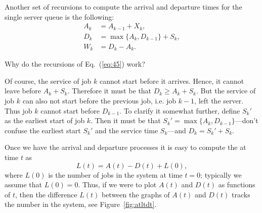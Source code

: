 Another set of recursions to compute the arrival and departure times for the single server queue is the following:
\begin{equation}
  \label{eq:45}
  \begin{split}
    A_k &= A_{k-1} + X_k, \\
    D_k &= \max\{A_k, D_{k-1}\} + S_k,\\
    W_k &= D_k - A_k.
  \end{split}
\end{equation}

\begin{exercise}  Why do the recursions of Eq.~(\ref{eq:45}) work? 
  \begin{solution}
 Of course, the service of job $k$ cannot start before it
      arrives. Hence, it cannot leave before $A_k + S_k$. Therefore it
      must be that $D_k \geq A_k +S_k$. But the service of job $k$ can
      also not start before the previous job, i.e. job $k-1$, left the
      server. Thus job $k$ cannot start before $D_{k-1}$. To clarify
      it somewhat further, define $S_k'$ as the earliest start of job
      $k$. Then it must be that $S_k' = \max\{A_k, D_{k-1}\}$---don't
      confuse the earliest start $S_k'$ and the service time
      $S_k$---and $D_k = S_k' + S_k$.
    \end{solution}
\end{exercise}

Once we have the arrival and departure processes it is easy to compute
the  at time $t$ as
\begin{equation}\label{eq:14}
  L(t) = A(t) - D(t) + L(0),
\end{equation}
where $L(0)$ is the number of jobs in the system at time $t=0$;
typically we assume that $L(0)=0$. Thus, if we were to plot $A(t)$ and
$D(t)$ as functions of $t$, then the difference $L(t)$ between the
graphs of $A(t)$ and $D(t)$ tracks the number in the system, see
Figure~\ref{fig:atltdt}. 



